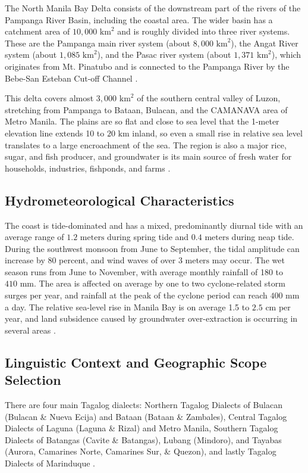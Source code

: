 \documentclass[12pt,a4paper]{report}
\begin{document}
The North Manila Bay Delta consists of the downstream part of the rivers of the Pampanga River Basin, including the coastal area. The wider basin has a catchment area of $10,000\text{ km}^2$ and is roughly divided into three river systems. These are the Pampanga main river system (about $8,000\text{ km}^2$), the Angat River system (about $1,085\text{ km}^2$), and the Pasac river system (about $1,371\text{ km}^2$), which originates from Mt. Pinatubo and is connected to the Pampanga River by the Bebe-San Esteban Cut-off Channel \parencite{RoyalHaskoningDHV}.

This delta covers almost $3,000\text{ km}^2$ of the southern central valley of Luzon, stretching from Pampanga to Bataan, Bulacan, and the CAMANAVA area of Metro Manila. The plains are so flat and close to sea level that the 1-meter elevation line extends 10 to $20\text{ km}$ inland, so even a small rise in relative sea level translates to a large encroachment of the sea. The region is also a major rice, sugar, and fish producer, and groundwater is its main source of fresh water for households, industries, fishponds, and farms \parencite{Rodolfo2003}.

\subsection{Hydrometeorological Characteristics}

The coast is tide-dominated and has a mixed, predominantly diurnal tide with an average range of $1.2\text{ meters}$ during spring tide and $0.4\text{ meters}$ during neap tide. During the southwest monsoon from June to September, the tidal amplitude can increase by 80 percent, and wind waves of over $3\text{ meters}$ may occur. The wet season runs from June to November, with average monthly rainfall of 180 to $410\text{ mm}$. The area is affected on average by one to two cyclone-related storm surges per year, and rainfall at the peak of the cyclone period can reach $400\text{ mm}$ a day. The relative sea-level rise in Manila Bay is on average 1.5 to $2.5\text{ cm}$ per year, and land subsidence caused by groundwater over-extraction is occurring in several areas \parencite{RoyalHaskoningDHV}.

\subsection{Linguistic Context and Geographic Scope Selection}

There are four main Tagalog dialects: Northern Tagalog Dialects of Bulacan (Bulacan \& Nueva Ecija) and Bataan (Bataan \& Zambales), Central Tagalog Dialects of Laguna (Laguna \& Rizal) and Metro Manila, Southern Tagalog Dialects of Batangas (Cavite \& Batangas), Lubang (Mindoro), and Tayabas (Aurora, Camarines Norte, Camarines Sur, \& Quezon), and lastly Tagalog Dialects of Marinduque \parencite{Adriano2022}.
\end{document}
